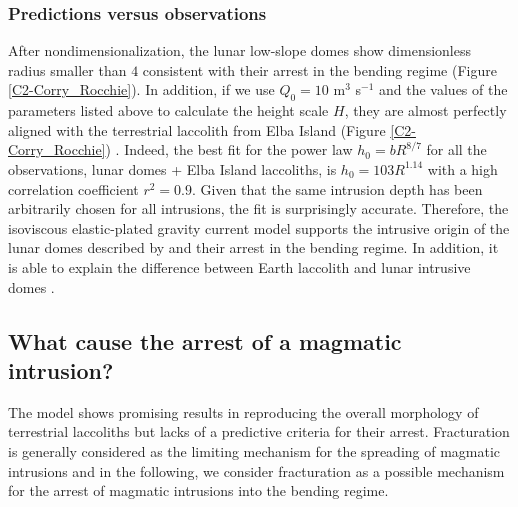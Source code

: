 \subsubsection*{Predictions versus observations}

After   nondimensionalization,   the   lunar  low-slope   domes   show
dimensionless radius smaller than $4$  consistent with their arrest in
the bending regime (Figure \ref{C2-Corry_Rocchie}). In addition, if we
use $Q_0=10$  m$^3$ s$^{-1}$ and  the values of the  parameters listed
above to  calculate the  height scale $H$,  they are  almost perfectly
aligned  with  the  terrestrial  laccolith from  Elba  Island  (Figure
\ref{C2-Corry_Rocchie}) \citep{Michaut:2011kg}.  Indeed,  the best fit
for the power law $h_0=bR^{8/7}$ for all the observations, lunar domes
+  Elba  Island  laccoliths,  is  $h_0  =  103R^{1.14}$  with  a  high
correlation coefficient $r^2=0.9$. Given that the same intrusion depth
has  been   arbitrarily  chosen  for   all  intrusions,  the   fit  is
surprisingly  accurate.   Therefore,   the  isoviscous  elastic-plated
gravity current model supports the intrusive origin of the lunar domes
described  by \citet{Wohler:2009jj}  and their  arrest in  the bending
regime.  In  addition, it  is able to  explain the  difference between
Earth laccolith and lunar intrusive domes \citep{Michaut:2011kg}.

\subsection{What cause the arrest of a magmatic intrusion?}

The  model   shows  promising  results  in   reproducing  the  overall
morphology  of  terrestrial  laccoliths  but  lacks  of  a  predictive
criteria for  their arrest.   Fracturation is generally  considered as
the limiting mechanism for the spreading of magmatic intrusions and in
the following,  we consider fracturation  as a possible  mechanism for
the arrest of magmatic intrusions into the bending regime.

